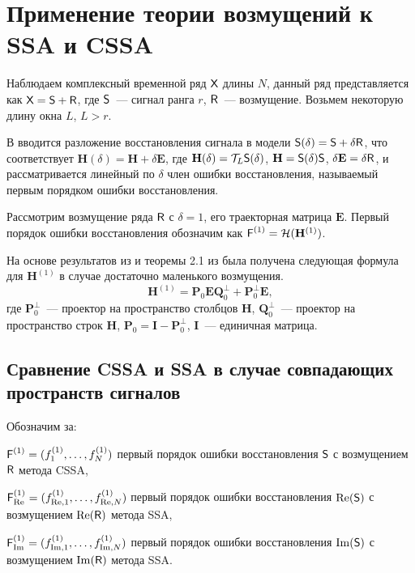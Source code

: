 \documentclass[12pt,a4paper]{article}
\begin{document}
\section{Применение теории возмущений к SSA и CSSA}

Наблюдаем комплексный временной ряд $\textsf{X}$ длины $N$, данный ряд представляется как $\textsf{X} = \textsf{S} + \textsf{R}$, где $\textsf{S}$~--- сигнал ранга $r$, $\textsf{R}$~--- возмущение.  Возьмем некоторую длину окна $L$, $L>r$.

В \cite{Nekrutkin} вводится разложение восстановления сигнала в модели $\textsf{S}(\delta) = \textsf{S} + \delta \textsf{R}$, что соответствует $\mathbf{H}(\delta) = \mathbf{H} + \delta \mathbf{E}$, где $\mathbf{H}(\delta) = \mathcal{T}_L \textsf{S}(\delta)$, $\mathbf{H} = \textsf{S}(\delta)\textsf{S}$, $\delta\mathbf{E} = \delta \textsf{R}$, и рассматривается линейный по $\delta$ член ошибки восстановления, называемый первым порядком ошибки восстановления.

Рассмотрим возмущение ряда $\textsf{R}$ с $\delta = 1$, его траекторная матрица $\mathbf{E}$. Первый порядок ошибки восстановления обозначим как $\textsf{F}^{(1)} = \mathcal{H}(\mathbf{H}^{(1)})$.

На основе результатов из \cite[стр.12]{Konstantinov} и теоремы 2.1 из \cite{Nekrutkin} была получена следующая формула для $\mathbf{H}^{(1)}$ в случае достаточно маленького возмущения.
\begin{equation} \label{eq:main}
	\mathbf{H}^{(1)} = \mathbf{P}_0 \mathbf{E} \mathbf{Q}^{\perp}_0 + \mathbf{P}^{\perp}_0 \mathbf{E},
\end{equation}
где $\mathbf{P}^{\perp}_0$~--- проектор на пространство столбцов $\mathbf{H}$, $\mathbf{Q}^{\perp}_0$~--- проектор на пространство строк $\mathbf{H}$, $\mathbf{P}_0 = \mathbf{I} - \mathbf{P}^{\perp}_0$, $\mathbf{I}$~--- единичная матрица.

\subsection{Сравнение CSSA и SSA в случае совпадающих пространств сигналов}

Обозначим за:

$\textsf{F}^{(1)} = (f^{(1)}_1, \ldots, f^{(1)}_N)$ первый порядок ошибки восстановления $\textsf{S}$ с возмущением $\textsf{R}$ метода CSSA,

$\textsf{F}^{(1)}_{\Re} = (f^{(1)}_{\Re,1}, \ldots, f^{(1)}_{\Re, N})$ первый порядок ошибки восстановления $\Re(\textsf{S})$ с возмущением $\Re(\textsf{R})$ метода SSA,

$\textsf{F}^{(1)}_{\Im} = (f^{(1)}_{\Im,1}, \ldots, f^{(1)}_{\Im, N})$ первый порядок ошибки восстановления $\Im(\textsf{S})$ с возмущением $\Im(\textsf{R})$ метода SSA.
\end{document}
